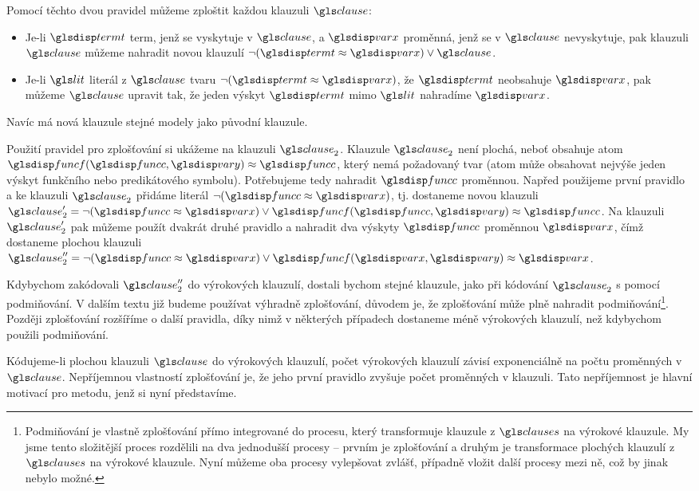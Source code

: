 Pomocí těchto dvou pravidel můžeme zploštit každou
klauzuli $\clause$:
\begin{itemize}
\item Je-li $\term$ term, jenž se vyskytuje v $\clause$, a $\var$ proměnná,
  jenž se v $\clause$ nevyskytuje, pak klauzuli $\clause$ můžeme
  nahradit novou klauzulí $\neg (\term \approx \var) \vee \clause$.
\item Je-li $\lit$ literál z $\clause$ tvaru $\neg (\term \approx \var)$,
  že $\term$ neobsahuje $\var$,
  pak můžeme $\clause$ upravit tak, že jeden výskyt $\term$
  mimo $\lit$ nahradíme $\var$.
\end{itemize}
Navíc má nová klauzule stejné modely jako původní klauzule.

Použití pravidel pro zplošťování si ukážeme na klauzuli $\clause_2$.
Klauzule $\clause_2$ není plochá, neboť obsahuje atom
$\func(\funcC, \varY) \approx \funcC$, který nemá požadovaný tvar
(atom může obsahovat nejvýše jeden výskyt funkčního nebo predikátového
symbolu). Potřebujeme tedy nahradit $\funcC$ proměnnou.
Napřed použijeme první pravidlo a ke klauzuli $\clause_2$ přidáme literál
$\neg (\funcC \approx \var)$, tj. dostaneme novou klauzuli
$\clause_2' = \neg (\funcC \approx \var) \vee
  \func(\funcC, \varY) \approx \funcC$.
Na klauzuli $\clause_2'$ pak můžeme použít dvakrát druhé pravidlo
a nahradit dva výskyty $\funcC$ proměnnou $\var$, čímž
dostaneme plochou klauzuli
$\clause_2'' = \neg (\funcC \approx \var) \vee
\func(\var, \varY) \approx \var$.

Kdybychom zakódovali
$\clause_2''$ do výrokových klauzulí, dostali bychom stejné klauzule,
jako při kódování $\clause_2$ s pomocí podmiňování.
V dalším textu již budeme používat výhradně zplošťování,
důvodem je, že zplošťování může plně nahradit
podmiňování\footnote{Podmiňování je vlastně zplošťování
přímo integrované do procesu, který transformuje klauzule z $\clauses$
na výrokové klauzule. My jsme tento složitější proces rozdělili na dva
jednodušší procesy -- prvním je zplošťování a druhým je transformace
plochých klauzulí z $\clauses$ na výrokové klauzule. Nyní
můžeme oba procesy vylepšovat zvlášť, případně vložit další procesy mezi
ně, což by jinak nebylo možné.}.
Později zplošťování rozšíříme o další pravidla,
díky nimž v některých případech dostaneme méně výrokových klauzulí,
než kdybychom použili podmiňování.

Kódujeme-li plochou klauzuli $\clause$ do výrokových klauzulí,
počet výrokových klauzulí závisí exponenciálně na počtu proměnných
v $\clause$.
Nepříjemnou vlastností zplošťování je, že jeho první pravidlo
zvyšuje počet proměnných v klauzuli. Tato nepříjemnost je hlavní motivací
pro metodu, jenž si nyní představíme.

